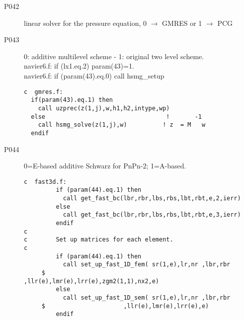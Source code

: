 \begin{description}
\item [P042  ] linear solver for the pressure equation, 0 $\rightarrow$ GMRES or 1 $\rightarrow$ PCG
\item [P043  ] 0: additive multilevel scheme - 1: original two level scheme.\\
navier6.f:      if (lx1.eq.2) param(43)=1.\\   
navier6.f:            if (param(43).eq.0) call hsmg\_setup         
\begin{lstlisting}
c  gmres.f:  
  if(param(43).eq.1) then
    call uzprec(z(1,j),w,h1,h2,intype,wp)
  else                                  !       -1
    call hsmg_solve(z(1,j),w)          ! z  = M   w
  endif   
\end{lstlisting} 
\item [P044  ] 0=E-based additive Schwarz for PnPn-2; 1=A-based.
\begin{lstlisting}
c  fast3d.f:
         if (param(44).eq.1) then
           call get_fast_bc(lbr,rbr,lbs,rbs,lbt,rbt,e,2,ierr)
         else
           call get_fast_bc(lbr,rbr,lbs,rbs,lbt,rbt,e,3,ierr)
         endif
c
c        Set up matrices for each element.
c
         if (param(44).eq.1) then
           call set_up_fast_1D_fem( sr(1,e),lr,nr ,lbr,rbr
     $                      ,llr(e),lmr(e),lrr(e),zgm2(1,1),nx2,e)
         else
           call set_up_fast_1D_sem( sr(1,e),lr,nr ,lbr,rbr
     $                      ,llr(e),lmr(e),lrr(e),e)
         endif


\end{lstlisting}
\end{description}
